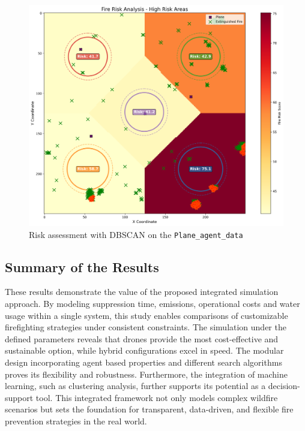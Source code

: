 \documentclass[11pt, a4paper]{article}
\begin{document}
\begin{figure}[!htbp]
    \centering
    \includegraphics[width=1\linewidth]{figures/enhanced_fire_risk_analysis.png}
    \caption{Risk assessment with DBSCAN on the \texttt{Plane\_agent\_data}}
    \label{fig:risk_assesment}
\end{figure}


\subsection{Summary of the Results}

These results demonstrate the value of the proposed integrated simulation approach. By modeling suppression time, emissions, operational costs and water usage within a single system, this study enables comparisons of customizable firefighting strategies under consistent constraints. The simulation under the defined parameters reveals that drones provide the most cost-effective and sustainable option, while hybrid configurations excel in speed. The modular design incorporating agent based properties and different search algorithms proves its flexibility and robustness. Furthermore, the integration of machine learning, such as clustering analysis, further supports its potential as a decision-support tool. This integrated framework not only models complex wildfire scenarios but sets the foundation for transparent, data-driven, and flexible fire prevention strategies in the real world.
\end{document}
